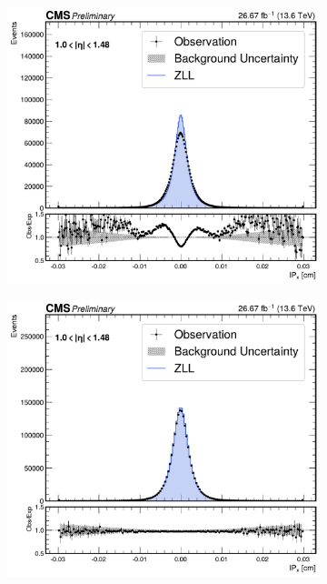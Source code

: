 \begin{figure}[!htbp]
        \centering
        \begin{subfigure}[b]{0.49\textwidth}
            \centering
            \includegraphics[width=\textwidth]{Figures/Chapter7/IP_Corrections/Before/ee/ip_x_1p0to1p48_comparison_with_ratio.pdf}
            \caption{}
        \end{subfigure}
        \begin{subfigure}[b]{0.49\textwidth}
            \centering
            \includegraphics[width=\textwidth]{Figures/Chapter7/IP_Corrections/After/ee/ip_x_1p0to1p48_comparison_with_ratio.pdf}
            \caption{}
        \end{subfigure}


\end{figure}
